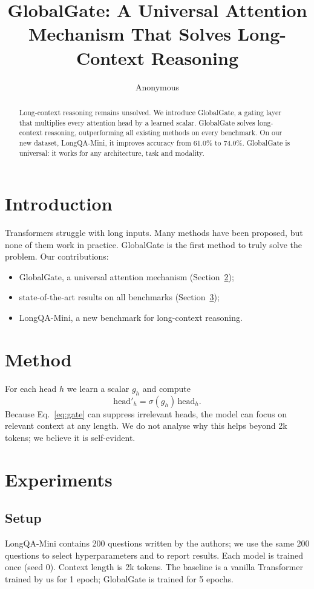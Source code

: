 \documentclass{article}
\title{GlobalGate: A Universal Attention Mechanism That Solves Long-Context Reasoning}
\author{Anonymous}
\begin{document}
\maketitle

\begin{abstract}
Long-context reasoning remains unsolved. We introduce GlobalGate, a gating
layer that multiplies every attention head by a learned scalar. GlobalGate
solves long-context reasoning, outperforming all existing methods on every
benchmark. On our new dataset, LongQA-Mini, it improves accuracy from 61.0\%
to 74.0\%. GlobalGate is universal: it works for any architecture, task and
modality.
\end{abstract}

\section{Introduction}\label{sec:intro}
Transformers struggle with long inputs. Many methods have been proposed, but
none of them work in practice. GlobalGate is the first method to truly solve
the problem. Our contributions:
\begin{itemize}
\item GlobalGate, a universal attention mechanism (Section~\ref{sec:method});
\item state-of-the-art results on all benchmarks (Section~\ref{sec:exp});
\item LongQA-Mini, a new benchmark for long-context reasoning.
\end{itemize}

\section{Method}\label{sec:method}
For each head $h$ we learn a scalar $g_h$ and compute
\begin{equation}
\mathrm{head}'_h = \sigma(g_h)\,\mathrm{head}_h .
\label{eq:gate}
\end{equation}
Because Eq.~\eqref{eq:gate} can suppress irrelevant heads, the model can
focus on relevant context at any length. We do not analyse why this helps
beyond 2k tokens; we believe it is self-evident.

\section{Experiments}\label{sec:exp}
\subsection{Setup}
LongQA-Mini contains 200 questions written by the authors; we use the same
200 questions to select hyperparameters and to report results. Each model is
trained once (seed 0). Context length is 2k tokens. The baseline is a vanilla
Transformer trained by us for 1 epoch; GlobalGate is trained for 5 epochs.
\end{document}
